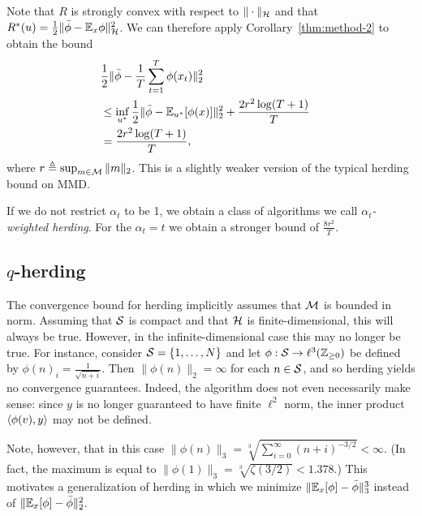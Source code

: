 \documentclass[paper.tex]{subfiles}
\begin{document}
Note that $R$ is strongly convex with respect to $\|\cdot\|_{\mathcal{H}}$ and that 
$R^*(u) = \frac{1}{2}\|\bar{\phi}-\mathbb{E}_{x}\phi\|_{\mathcal{H}}^2$. We can 
therefore apply Corollary~\ref{thm:method-2} to obtain the bound
\begin{align*}
\lefteqn{\frac{1}{2}\|\bar{\phi}-\frac{1}{T}\sum_{t=1}^T \phi(x_t)\|_2^2} \\
 &\leq \inf_{u^*} \frac{1}{2}\|\bar{\phi}-\bE_{u^*}[\phi(x)]\|_2^2 + \frac{2r^2\log(T+1)}{T} \\
 &= \frac{2r^2\log(T+1)}{T},
\end{align*}
where $r \triangleq \sup_{m \in \mathcal{M}} \|m\|_2$. This is a slightly weaker 
version of the typical herding bound on MMD.

If we do not restrict $\alpha_{t}$ to be 1, we obtain a class of algorithms
we call {\em $\alpha_{t}$-weighted herding}. For the $\alpha_t = t$ we obtain 
a stronger bound of $\frac{8r^2}{T}$.

\subsection{$q$-herding}
\label{sec:infinite-case}

The convergence bound for herding implicitly assumes that 
$\mathcal{M}$ is bounded in norm. Assuming that $\mathcal{S}$ is compact 
and that $\mathcal{H}$ is finite-dimensional, this will always be true. However, in 
the infinite-dimensional case this may no longer be true. 
For instance, consider $\mathcal{S} = \{1,\ldots,N\}$ and let 
$\phi : \mathcal{S} \to \ell^3(\mathbb{Z}_{\geq 0})$ be
defined by $\phi(n)_i = \frac{1}{\sqrt{n+i}}$. Then 
$\|\phi(n)\|_2 = \infty$ for each $n \in \mathcal{S}$, and so herding 
yields no convergence guarantees. Indeed, the algorithm 
does not even necessarily make sense: since $y$ is 
no longer guaranteed to have finite $\ell^2$ norm, the 
inner product $\left\langle \phi(v), y \right\rangle$ may not be defined.

Note, however, that in this case
$\|\phi(n)\|_3 = \sqrt[3]{\sum_{i=0}^{\infty} (n+i)^{-3/2}} < \infty$.
(In fact, the maximum is equal to
$\|\phi(1)\|_3 = \sqrt[3]{\zeta(3/2)} < 1.378$.) This motivates 
a generalization of herding in which we minimize 
$\|\mathbb{E}_{x}[\phi]-\bar{\phi}\|_3^3$ instead of 
$\|\mathbb{E}_{x}[\phi]-\bar{\phi}\|_2^2$.
\end{document}
